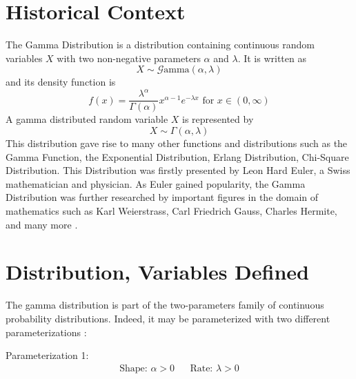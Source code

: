 \documentclass[12pt]{article}
\newcommand{\G}{\mathcal{G}}
\begin{document}
\singlespacing

\tableofcontents\pagebreak
\doublespacing
\section{Historical Context}
The Gamma Distribution is a distribution containing continuous random variables $X$ with two non-negative parameters
$\alpha$ and $\lambda$. It is written as
\begin{equation}
	X\sim\G\text{amma}(\alpha, \lambda)
\end{equation}
and its density function is
\begin{equation}
	f(x)=\frac{\lambda^\alpha}{\Gamma(\alpha)}x^{\alpha-1}e^{-\lambda x}\text{ for }x\in(0,\infty)
\end{equation}
A gamma distributed
random variable $X$ is represented by
\begin{equation}
	X\sim\Gamma(\alpha,\lambda)
\end{equation}
This distribution gave rise to many other functions and distributions such as the Gamma Function, the Exponential
Distribution, Erlang Distribution, Chi-Square Distribution. This Distribution was firstly presented by Leon Hard Euler,
a Swiss mathematician and physician. As Euler gained popularity, the Gamma Distribution was further researched by
important figures in the domain of mathematics such as Karl Weierstrass, Carl Friedrich Gauss, Charles Hermite, and many
more\cite{hoschGammaDistribution2017, wikipediaGammaDistribution2022, sebahIntroductionGammaFunction2002} .

\pagebreak
\section{Distribution, Variables Defined}
The gamma distribution is part of the two-parameters family of continuous probability distributions. Indeed, it may be
parameterized with two different parameterizations\cite{wikipediaGammaDistribution2022} :

\noindent Parameterization 1:
\vspace*{-24pt}
\begin{align}\label{eq:gamma:parameterization:1}
	\text{Shape: } \alpha>0		&&	\text{Rate: }\lambda>0
\end{align}
\end{document}
